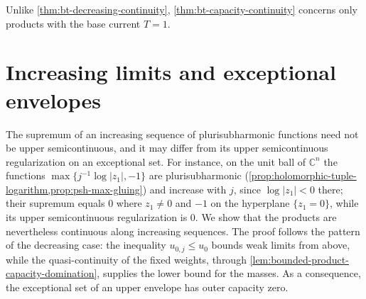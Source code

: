 Unlike \cref{thm:bt-decreasing-continuity}, \cref{thm:bt-capacity-continuity} concerns only products with the base current $T=1$.

\section{Increasing limits and exceptional envelopes}
\label{sec:bt-increasing}

The supremum of an increasing sequence of plurisubharmonic functions need not be upper semicontinuous, and it may differ from its upper semicontinuous regularization on an exceptional set. For instance, on the unit ball of $\mathbb C^n$ the functions $\max\{j^{-1}\log|z_1|,-1\}$ are plurisubharmonic (\cref{prop:holomorphic-tuple-logarithm,prop:psh-max-gluing}) and increase with $j$, since $\log|z_1|<0$ there; their supremum equals $0$ where $z_1\ne0$ and $-1$ on the hyperplane $\{z_1=0\}$, while its upper semicontinuous regularization is $0$. We show that the products are nevertheless continuous along increasing sequences. The proof follows the pattern of the decreasing case: the inequality $u_{0,j}\le u_0$ bounds weak limits from above, while the quasi-continuity of the fixed weights, through \cref{lem:bounded-product-capacity-domination}, supplies the lower bound for the masses. As a consequence, the exceptional set of an upper envelope has outer capacity zero.

